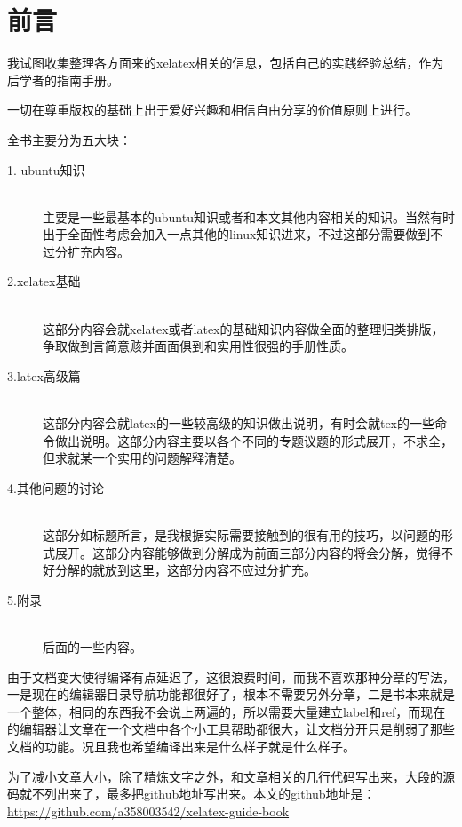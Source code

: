 \documentclass[12pt,oneside]{book}
\begin{document}
\frontmatter   

\author{万泽}
\titleLB

\chapter*{前言}
\begin{common-format}
我试图收集整理各方面来的xelatex相关的信息，包括自己的实践经验总结，作为后学者的指南手册。

一切在尊重版权的基础上出于爱好兴趣和相信自由分享的价值原则上进行。

全书主要分为五大块：
\begin{description}
\item[1. ubuntu知识] \hfill \\
主要是一些最基本的ubuntu知识或者和本文其他内容相关的知识。当然有时出于全面性考虑会加入一点其他的linux知识进来，不过这部分需要做到不过分扩充内容。
\item[2.xelatex基础] \hfill \\
这部分内容会就xelatex或者latex的基础知识内容做全面的整理归类排版，争取做到言简意赅并面面俱到和实用性很强的手册性质。
\item[3.latex高级篇] \hfill \\
这部分内容会就latex的一些较高级的知识做出说明，有时会就tex的一些命令做出说明。这部分内容主要以各个不同的专题议题的形式展开，不求全，但求就某一个实用的问题解释清楚。
\item[4.其他问题的讨论] \hfill \\
这部分如标题所言，是我根据实际需要接触到的很有用的技巧，以问题的形式展开。这部分内容能够做到分解成为前面三部分内容的将会分解，觉得不好分解的就放到这里，这部分内容不应过分扩充。
\item[5.附录] \hfill \\
后面的一些内容。
\end{description}

由于文档变大使得编译有点延迟了，这很浪费时间，而我不喜欢那种分章的写法，一是现在的编辑器目录导航功能都很好了，根本不需要另外分章，二是书本来就是一个整体，相同的东西我不会说上两遍的，所以需要大量建立label和ref，而现在的编辑器让文章在一个文档中各个小工具帮助都很大，让文档分开只是削弱了那些文档的功能。况且我也希望编译出来是什么样子就是什么样子。

为了减小文章大小，除了精炼文字之外，和文章相关的几行代码写出来，大段的源码就不列出来了，最多把github地址写出来。本文的github地址是：\\
\href{https://github.com/a358003542/xelatex-guide-book}{https://github.com/a358003542/xelatex-guide-book}


\end{common-format}
\end{document}
